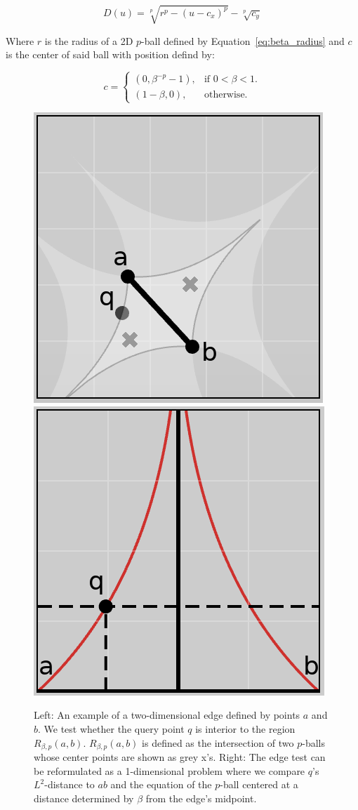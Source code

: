 \begin{equation}
    \label{eq:beta_parameterization}
    D(u) = \sqrt[p]{r^{p} - (u - c_x)^p} - \sqrt[p]{c_y}
\end{equation}

Where $r$ is the radius of a 2D $p$-ball defined by Equation~\ref{eq:beta_radius} and $c$ is the center of said ball with position defind by:

\begin{equation}
    c =
    \begin{cases}
        \left(0, \beta^{-p} - 1\right), & \text{if $0 < \beta < 1$}.\\
       \left(1-\beta, 0\right), & \text{otherwise}.
    \end{cases}
\end{equation}

\begin{figure}[htbp]
    \includegraphics[width=0.48\linewidth]{figs/chap7/bskeleton.png}
    \includegraphics[width=0.48\linewidth]{figs/chap7/bskeletonParameter.png}
    \caption{Left: An example of a two-dimensional edge defined by points $a$ and $b$.
    We test whether the query point $q$ is interior to the region $R_{\beta,p}(a,b)$.
    $R_{\beta,p}(a,b)$ is defined as the intersection of two $p$-balls whose center points are shown as grey x's.
    Right: The edge test can be reformulated as a 1-dimensional problem where we compare $q$'s $L^2$-distance to $ab$ and the equation of the $p$-ball centered at a distance determined by $\beta$ from the edge's midpoint.}
    \label{fig:gabriel_p_shapes}
\end{figure}

